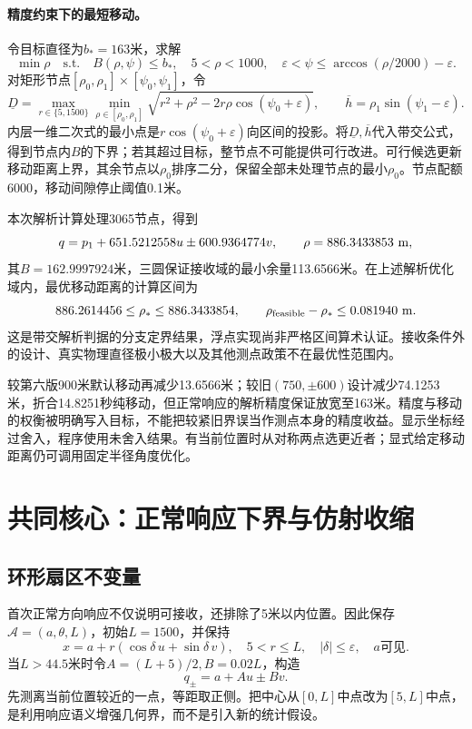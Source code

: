 \documentclass[UTF8,a4paper,zihao=-4,fontset=windows]{ctexart}
\begin{document}
\paragraph{精度约束下的最短移动。}
令目标直径为$b_*=163$米，求解
\[
\min \rho\quad\text{s.t.}\quad B(\rho,\psi)\le b_*,
\quad 5<\rho<1000,\quad
\varepsilon<\psi\le\arccos(\rho/2000)-\varepsilon .
\]
对矩形节点$[\rho_0,\rho_1]\times[\psi_0,\psi_1]$，令
\[
\underline D=\max_{r\in\{5,1500\}}\min_{\rho\in[\rho_0,\rho_1]}
\sqrt{r^2+\rho^2-2r\rho\cos(\psi_0+\varepsilon)},\qquad
\overline h=\rho_1\sin(\psi_1-\varepsilon).
\]
内层一维二次式的最小点是$r\cos(\psi_0+\varepsilon)$向区间的投影。将$\underline D,\overline h$代入带交公式，得到节点内$B$的下界；若其超过目标，整节点不可能提供可行改进。可行候选更新移动距离上界，其余节点以$\rho_0$排序二分，保留全部未处理节点的最小$\rho_0$。节点配额6000，移动间隙停止阈值0.1米。

本次解析计算处理3065节点，得到
\begin{equation}\label{eq:q2}
q=p_1+651.5212558u\pm600.9364774v,
\qquad \rho=886.3433853\ {\rm m},
\end{equation}
其$B=162.9997924$米，三圆保证接收域的最小余量113.6566米。在上述解析优化域内，最优移动距离的计算区间为
\[
886.2614456\le \rho_*\le886.3433854,\qquad
\rho_{\rm feasible}-\rho_*\le0.081940\ {\rm m}.
\]
这是带交解析判据的分支定界结果，浮点实现尚非严格区间算术认证。接收条件外的设计、真实物理直径极小极大以及其他测点政策不在最优性范围内。

较第六版900米默认移动再减少13.6566米；较旧$(750,\pm600)$设计减少74.1253米，折合14.8251秒纯移动，但正常响应的解析精度保证放宽至163米。精度与移动的权衡被明确写入目标，不能把较紧旧界误当作测点本身的精度收益。显示坐标经过舍入，程序使用未舍入结果。有当前位置时从对称两点选更近者；显式给定移动距离仍可调用固定半径角度优化。

\section{共同核心：正常响应下界与仿射收缩}
\subsection{环形扇区不变量}
首次正常方向响应不仅说明可接收，还排除了5米以内位置。因此保存$\mathcal A=(a,\theta,L)$，初始$L=1500$，并保持
\begin{equation}\label{eq:invariant}
x=a+r(\cos\delta\,u+\sin\delta\,v),\quad 5<r\le L,\quad |\delta|\le\varepsilon,
\quad a\text{可见}.
\end{equation}
当$L>44.5$米时令$A=(L+5)/2,B=0.02L$，构造
\begin{equation}\label{eq:pair}
q_\pm=a+Au\pm Bv.
\end{equation}
先测离当前位置较近的一点，等距取正侧。把中心从$[0,L]$中点改为$[5,L]$中点，是利用响应语义增强几何界，而不是引入新的统计假设。
\end{document}
